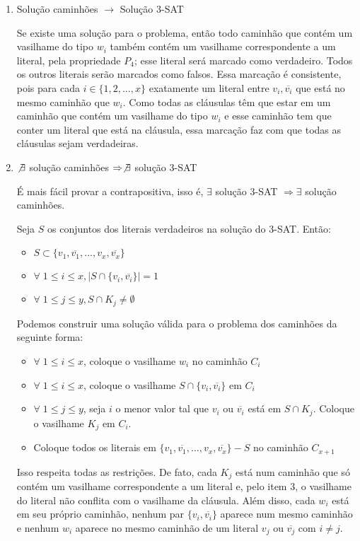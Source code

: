 \documentclass[11pt]{article}
\begin{document}
\begin{enumerate}
\item Solução caminhões $\to$ Solução 3-SAT
\label{sec-3-3-2-1}

Se existe uma solução para o problema, então todo caminhão que contém
um vasilhame do tipo $w_i$ também contém um vasilhame correspondente a
um literal, pela propriedade $P_4$; esse literal será marcado como
verdadeiro. Todos os outros literais serão marcados como falsos. Essa
marcação é consistente, pois para cada $i \in \{1, 2, \ldots, x\}$
exatamente um literal entre $v_i, \overline{v_i}$ que está no mesmo
caminhão que $w_i$. Como todas as cláusulas têm que estar em um
caminhão que contém um vasilhame do tipo $w_i$ e esse caminhão tem que
conter um literal que está na cláusula, essa marcação faz com que
todas as cláusulas sejam verdadeiras.


\item $\not \exists$ solução caminhões $\Rightarrow \not \exists$ solução 3-SAT
\label{sec-3-3-2-2}

É mais fácil provar a contrapositiva, isso é, $\exists$ solução 3-SAT
$\Rightarrow \exists$ solução caminhões.

Seja $S$ os conjuntos dos literais verdadeiros na solução do 3-SAT.
Então:
\begin{itemize}
\item $S \subset \{v_1,\overline{v_1}, \ldots, v_x, \overline{v_x}\}$
\item $\forall \; 1\leq i \leq x, |S\cap\{v_i, \overline{v_i}\}| = 1$
\item $\forall \; 1\leq j \leq y, S\cap K_j \neq \emptyset$
\end{itemize}

Podemos construir uma solução válida para o problema dos caminhões da
seguinte forma:
\begin{itemize}
\item $\forall \; 1\leq i \leq x$, coloque o vasilhame $w_i$ no caminhão $C_i$
\item $\forall \; 1\leq i \leq x$, coloque o vasilhame $S\cap\{v_i, \overline{v_i}\}$ em $C_i$
\item $\forall \; 1\leq j \leq y$, seja $i$ o menor valor tal que $v_i$ ou
$\overline{v_i}$ está em $S\cap K_j$. Coloque o vasilhame $K_j$ em $C_i$.
\item Coloque todos os literais em $\{v_1,\overline{v_1}, \ldots, v_x,
  \overline{v_x}\} - S$ no caminhão $C_{x+1}$
\end{itemize}


Isso respeita todas as restrições. De fato, cada $K_j$ está num
caminhão que só contém um vasilhame correspondente a um literal e,
pelo item 3, o vasilhame do literal não conflita com o vasilhame da
cláusula. Além disso, cada $w_i$ está em seu próprio caminhão, nenhum
par $\{v_i, \overline{v_i}\}$ aparece num mesmo caminhão e nenhum
$w_i$ aparece no mesmo caminhão de um literal $v_j$ ou
$\overline{v_j}$ com $i \neq j$.
\end{enumerate}
\end{document}
